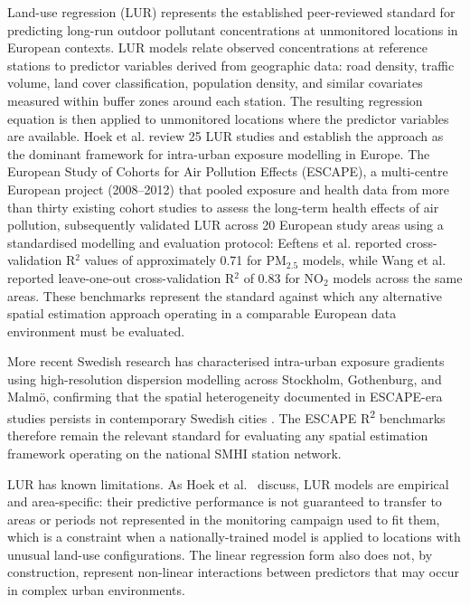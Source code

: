 \documentclass[11pt,a4paper]{article}
\begin{document}
Land-use regression (LUR) represents the established peer-reviewed standard for predicting long-run outdoor pollutant concentrations at unmonitored locations in European contexts. LUR models relate observed concentrations at reference stations to predictor variables derived from geographic data: road density, traffic volume, land cover classification, population density, and similar covariates measured within buffer zones around each station. The resulting regression equation is then applied to unmonitored locations where the predictor variables are available. Hoek et al. \cite{hoek_lur_review_2008} review 25 LUR studies and establish the approach as the dominant framework for intra-urban exposure modelling in Europe. The European Study of Cohorts for Air Pollution Effects (ESCAPE), a multi-centre European project (2008--2012) that pooled exposure and health data from more than thirty existing cohort studies to assess the long-term health effects of air pollution, subsequently validated LUR across 20 European study areas using a standardised modelling and evaluation protocol: Eeftens et al. \cite{eeftens_escape_pm_2012} reported cross-validation R$^{2}$ values of approximately 0.71 for PM$_{2.5}$ models, while Wang et al. \cite{wang_escape_no2_2013} reported leave-one-out cross-validation R$^{2}$ of 0.83 for NO$_2$ models across the same areas. These benchmarks represent the standard against which any alternative spatial estimation approach operating in a comparable European data environment must be evaluated.

More recent Swedish research has characterised intra-urban exposure gradients using high-resolution dispersion modelling across Stockholm, Gothenburg, and Malmö, confirming that the spatial heterogeneity documented in ESCAPE-era studies persists in contemporary Swedish cities \cite{sweden_dispersion_2024}. The ESCAPE R\textsuperscript{2} benchmarks therefore remain the relevant standard for evaluating any spatial estimation framework operating on the national SMHI station network.

LUR has known limitations. As Hoek et al.~\cite{hoek_lur_review_2008} discuss, LUR models are empirical and area-specific: their predictive performance is not guaranteed to transfer to areas or periods not represented in the monitoring campaign used to fit them, which is a constraint when a nationally-trained model is applied to locations with unusual land-use configurations. The linear regression form also does not, by construction, represent non-linear interactions between predictors that may occur in complex urban environments.
\end{document}
